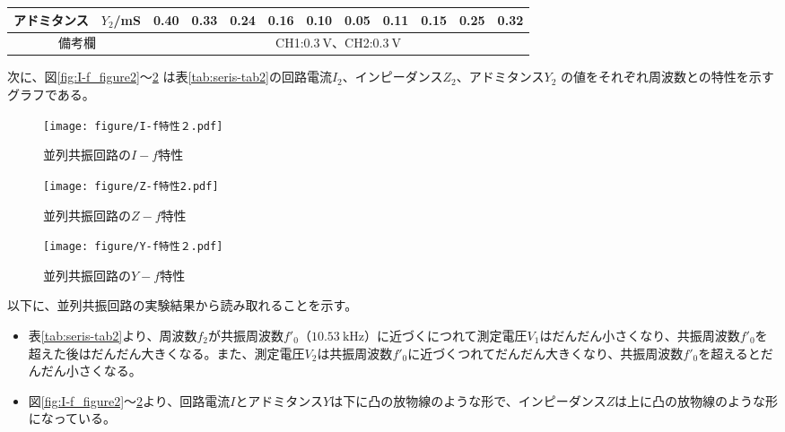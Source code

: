 \documentclass[12pt,a4paper]{jsarticle}
\numberwithin{equation}{section}
\numberwithin{figure}{section}
\numberwithin{table}{section}
\begin{document}
\begin{table}[H]
\begin{center}
{\begin{tabular}{|c|c|cccccccccc|}
            アドミタンス  &$Y_2$/\si{\milli\siemens} &         0.40          &        0.33        &        0.24        &         0.16          &         0.10           &        0.05          &           0.11           &        0.15       &         0.25       &          0.32         \\
            \hline
            \multicolumn{2}{|c|}{備考欄}            & \multicolumn{10}{c|}{CH1:$\SI{0.3}{\volt}$、CH2:$\SI{0.3}{\volt}$}\\
            \hline
        \end{tabular}
      }
    \end{center}
    次に、図\ref{fig:I-f_figure2}～\ref{fig:Y-f_figure2} は表\ref{tab:seris-tab2}の回路電流$I_2$、インピーダンス$Z_2$、アドミタンス$Y_2$ の値をそれぞれ周波数との特性を示すグラフである。
    
    \end{table}
    \begin{figure}[H]
      \begin{minipage}[H]{0.5\linewidth}
        \centering
          \texttt{[image: figure/I-f特性２.pdf]}
          \caption{並列共振回路の$I-f$特性}\label{fig:I-f_figure2}
      \end{minipage}
      \begin{minipage}[H]{0.5\linewidth}        
        \centering
          \texttt{[image: figure/Z-f特性2.pdf]}
          \caption{並列共振回路の$Z-f$特性}\label{fig:Z-f_figure2}
      \end{minipage}
  \end{figure}
  \begin{figure}[H]
    \centering
      \texttt{[image: figure/Y-f特性２.pdf]}
      \caption{並列共振回路の$Y-f$特性}\label{fig:Y-f_figure2}
  \end{figure}

  以下に、並列共振回路の実験結果から読み取れることを示す。
  \begin{itemize}
    \item 表\ref{tab:seris-tab2}より、周波数$f_2$が共振周波数$f'_0$（$\SI{10.53}{\kilo\hertz}$）に近づくにつれて測定電圧$V_1$はだんだん小さくなり、共振周波数$f'_0$を超えた後はだんだん大きくなる。また、測定電圧$V_2$は共振周波数$f'_0$に近づくつれてだんだん大きくなり、共振周波数$f'_0$を超えるとだんだん小さくなる。
    \item 図\ref{fig:I-f_figure2}～\ref{fig:Y-f_figure2}より、回路電流$I$とアドミタンス$Y$は下に凸の放物線のような形で、インピーダンス$Z$は上に凸の放物線のような形になっている。
  \end{itemize}
\end{document}
